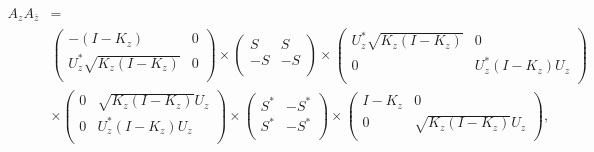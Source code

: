 \documentclass{amsart}
\begin{document}
\begin{align*}
A_{z}A_{\overline{z}} &=\\
& \left(
                                       \begin{array}{cc}
                                        - (I-K_z) & 0 \\
                                         U^{*}_{z}\sqrt{K_{z}(I-K_{z})} & 0 \\
                                       \end{array}
                                     \right) \times
                                     \left(
                                       \begin{array}{cc}
                                         S & S \\
                                         -S & -S \\
                                       \end{array}
                                     \right)\times
                                     \left(
                                       \begin{array}{cc}
                                         U^{*}_{z}\sqrt{K_{z}(I-K_{z})} & 0 \\
                                         0 & U^{*}_{z}(I- K_{z})U_z \\
                                       \end{array}
                                     \right) \\
&\times \left(
                                       \begin{array}{cc}
                                        0 & \sqrt{K_{z}(I- K_{z})}U_{z} \\
                                        0 & U^{*}_{z}(I-K_z)U_{z} \\
                                       \end{array}
                                     \right) \times
                                    \left(
                                     \begin{array}{cc}
                                          S^{*} & -S^{*} \\
                                          S^{*} & -S^{*} \\
                                        \end{array}
                                      \right) \times
                                     \left(
                                        \begin{array}{cc}
                                          I- K_z & 0 \\
                                          0 & \sqrt{K_{z}(I - K_z)}U_z \\
                                        \end{array}
                                      \right),
\end{align*}
\end{document}
